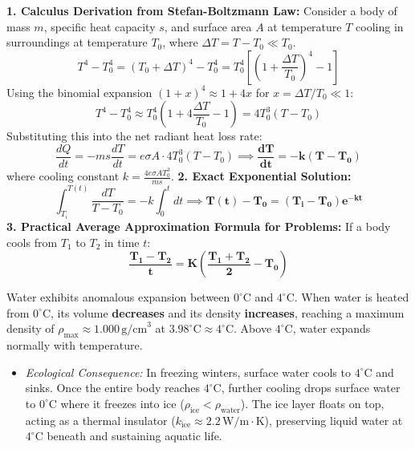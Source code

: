 \documentclass[10pt,a4paper]{article}
\begin{document}
\begin{formulabox}
\textbf{1. Calculus Derivation from Stefan-Boltzmann Law:}
Consider a body of mass $m$, specific heat capacity $s$, and surface area $A$ at temperature $T$ cooling in surroundings at temperature $T_0$, where $\Delta T = T - T_0 \ll T_0$.
\begin{equation}
  T^4 - T_0^4 = (T_0 + \Delta T)^4 - T_0^4 = T_0^4 \left[\left(1 + \frac{\Delta T}{T_0}\right)^4 - 1\right]
\end{equation}
Using the binomial expansion $(1 + x)^4 \approx 1 + 4x$ for $x = \Delta T / T_0 \ll 1$:
\begin{equation}
  T^4 - T_0^4 \approx T_0^4 \left(1 + 4\frac{\Delta T}{T_0} - 1\right) = 4 T_0^3 (T - T_0)
\end{equation}
Substituting this into the net radiant heat loss rate:
\begin{equation}
  \frac{dQ}{dt} = -m s \frac{dT}{dt} = e \sigma A \cdot 4 T_0^3 (T - T_0) \implies \mathbf{\frac{dT}{dt} = -k (T - T_0)}
\end{equation}
where cooling constant $k = \frac{4 e \sigma A T_0^3}{m s}$.
\textbf{2. Exact Exponential Solution:}
\begin{equation}
  \int_{T_i}^{T(t)} \frac{dT}{T - T_0} = -k \int_0^t dt \implies \mathbf{T(t) - T_0 = (T_i - T_0) e^{-k t}}
\end{equation}
\textbf{3. Practical Average Approximation Formula for Problems:}
If a body cools from $T_1$ to $T_2$ in time $t$:
\begin{equation}
  \mathbf{\frac{T_1 - T_2}{t} = K \left(\frac{T_1 + T_2}{2} - T_0\right)}
\end{equation}
\end{formulabox}

\begin{ncertbox}
Water exhibits anomalous expansion between $0^\circ\mathrm{C}$ and $4^\circ\mathrm{C}$. When water is heated from $0^\circ\mathrm{C}$, its volume \textbf{decreases} and its density \textbf{increases}, reaching a maximum density of $\rho_{\max} \approx 1.000\,\mathrm{g/cm}^3$ at $3.98^\circ\mathrm{C} \approx 4^\circ\mathrm{C}$. Above $4^\circ\mathrm{C}$, water expands normally with temperature.
\begin{itemize}
  \item \textit{Ecological Consequence:} In freezing winters, surface water cools to $4^\circ\mathrm{C}$ and sinks. Once the entire body reaches $4^\circ\mathrm{C}$, further cooling drops surface water to $0^\circ\mathrm{C}$ where it freezes into ice ($\rho_{\text{ice}} < \rho_{\text{water}}$). The ice layer floats on top, acting as a thermal insulator ($k_{\text{ice}} \approx 2.2\,\mathrm{W/m\cdot K}$), preserving liquid water at $4^\circ\mathrm{C}$ beneath and sustaining aquatic life.
\end{itemize}
\end{ncertbox}
\end{document}
